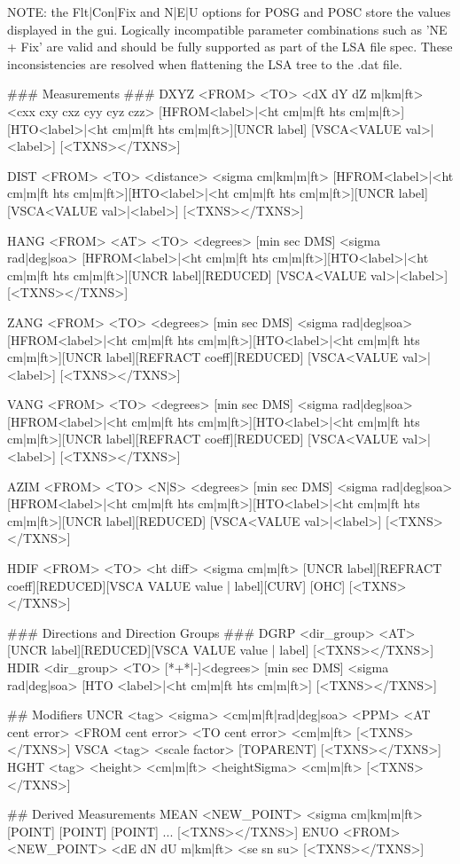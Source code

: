 \begin{landscape}
\begin{Snippet}
NOTE: the Flt|Con|Fix and N|E|U options for POSG and POSC store the values displayed in the gui. Logically 
incompatible parameter combinations such as 'NE + Fix' are valid and should be fully supported as part 
of the LSA file spec. These inconsistencies are resolved when flattening the LSA tree to the .dat file.

### Measurements ###
DXYZ <FROM> <TO> <dX dY dZ m|km|ft> <cxx cxy cxz cyy cyz czz> 
[HFROM<label>|<ht cm|m|ft hts cm|m|ft>][HTO<label>|<ht cm|m|ft hts cm|m|ft>][UNCR label]
[VSCA<VALUE val>|<label>] [<TXNS></TXNS>]

DIST <FROM> <TO> <distance> <sigma cm|km|m|ft> 
[HFROM<label>|<ht cm|m|ft hts cm|m|ft>][HTO<label>|<ht cm|m|ft hts cm|m|ft>][UNCR label]
[VSCA<VALUE val>|<label>] [<TXNS></TXNS>]

HANG <FROM> <AT> <TO> <degrees> [min sec DMS] <sigma rad|deg|soa> 
[HFROM<label>|<ht cm|m|ft hts cm|m|ft>][HTO<label>|<ht cm|m|ft hts cm|m|ft>][UNCR label][REDUCED]
[VSCA<VALUE val>|<label>] [<TXNS></TXNS>]

ZANG <FROM> <TO> <degrees> [min sec DMS] <sigma rad|deg|soa> 
[HFROM<label>|<ht cm|m|ft hts cm|m|ft>][HTO<label>|<ht cm|m|ft hts cm|m|ft>][UNCR label][REFRACT coeff][REDUCED]
[VSCA<VALUE val>|<label>] 
[<TXNS></TXNS>]

VANG <FROM> <TO> <degrees> [min sec DMS] <sigma rad|deg|soa> 
[HFROM<label>|<ht cm|m|ft hts cm|m|ft>][HTO<label>|<ht cm|m|ft hts cm|m|ft>][UNCR label][REFRACT coeff][REDUCED]
[VSCA<VALUE val>|<label>] 
[<TXNS></TXNS>]

AZIM <FROM> <TO> <N|S> <degrees> [min sec DMS] <sigma rad|deg|soa> 
[HFROM<label>|<ht cm|m|ft hts cm|m|ft>][HTO<label>|<ht cm|m|ft hts cm|m|ft>][UNCR label][REDUCED]
[VSCA<VALUE val>|<label>] [<TXNS></TXNS>]

HDIF <FROM> <TO> <ht diff> <sigma cm|m|ft> 
[UNCR label][REFRACT coeff][REDUCED][VSCA VALUE value | label][CURV] [OHC] [<TXNS></TXNS>]

### Directions and Direction Groups ###
DGRP <dir_group> <AT> [UNCR label][REDUCED][VSCA VALUE value | label] [<TXNS></TXNS>]
HDIR <dir_group> <TO> [*+*|-]<degrees> [min sec DMS] <sigma rad|deg|soa> [HTO <label>|<ht cm|m|ft hts cm|m|ft>]
[<TXNS></TXNS>]

## Modifiers
UNCR <tag> <sigma> <cm|m|ft|rad|deg|soa> <PPM> <AT cent error> <FROM cent error> <TO cent error> <cm|m|ft>
[<TXNS></TXNS>]
VSCA <tag> <scale factor> [TOPARENT] [<TXNS></TXNS>]
HGHT <tag> <height> <cm|m|ft> <heightSigma> <cm|m|ft> [<TXNS></TXNS>]

## Derived Measurements
MEAN <NEW_POINT> <sigma cm|km|m|ft> [POINT] [POINT] [POINT] ... [<TXNS></TXNS>]
ENUO <FROM> <NEW_POINT> <dE dN dU m|km|ft> <se sn su> [<TXNS></TXNS>]
\end{Snippet}
\end{landscape}




